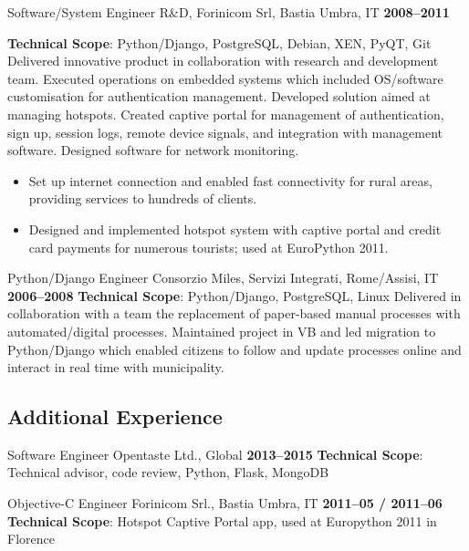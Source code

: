 \documentclass[10pt,a4paper,sans]{moderncv}
\begin{document}
\cventry{}
    {Software/System Engineer}
    {R\&D, Forinicom Srl, Bastia Umbra, IT}
    {\textbf{2008--2011}}
    {}
    {\textbf{Technical Scope}: Python/Django, PostgreSQL, Debian, XEN, PyQT,
    Git\newline
    Delivered innovative product in collaboration with research and development
    team. Executed operations on embedded systems which included OS/software
    customisation for authentication management. Developed solution aimed at
    managing hotspots. Created captive portal for management of authentication,
    sign up, session logs, remote device signals, and integration with
    management software. Designed software for network monitoring.
    \begin{itemize}
        \item Set up internet connection and enabled fast connectivity for
            rural areas, providing services to hundreds of clients.
        \item Designed and implemented hotspot system with captive portal and
            credit card payments for numerous tourists; used at EuroPython
            2011.
    \end{itemize}}

\cventry{}
    {Python/Django Engineer}
    {Consorzio Miles, Servizi Integrati, Rome/Assisi, IT}
    {\textbf{2006--2008}}
    {}
    {\textbf{Technical Scope}: Python/Django, PostgreSQL, Linux\newline
    Delivered in collaboration with a team the replacement of paper-based
    manual processes with automated/digital processes. Maintained project in
    VB and led migration to Python/Django which enabled citizens to follow and
    update processes online and interact in real time with municipality.}

\subsection{Additional Experience}

    {Software Engineer}
    {Opentaste Ltd., Global}
    {\textbf{2013--2015}}
    {\textbf{Technical Scope}: Technical advisor, code review, Python, Flask,
    MongoDB}
    {}

    {Objective-C Engineer}
    {Forinicom Srl., Bastia Umbra, IT}
    {\textbf{2011--05 / 2011--06}}
    {\textbf{Technical Scope}: Hotspot Captive Portal app, used at Europython
    2011 in Florence}
    {}
\end{document}
